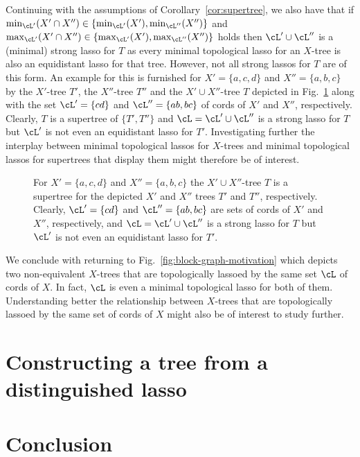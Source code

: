 Continuing with the assumptions of Corollary~\ref{cor:supertree}, we also have
that if $\min_{\cL'}(X'\cap X'')\in \{\min_{\cL'}(X'), \min_{\cL''}(X'')\}$
and $\max_{\cL'}(X'\cap X'')\in \{\max_{\cL'}(X'), \max_{\cL''}(X'')\}$ holds
then $\cL'\cup \cL''$ is a (minimal) strong lasso for $T$ as every minimal
topological lasso for an $X$-tree is also an equidistant lasso for that
tree. However, not all strong lassos for $T$ are of this form. An example for
this is furnished for $X'=\{a,c,d\}$ and $X''=\{a,b,c\}$ by the $X'$-tree
$T'$, the $X''$-tree $T''$ and the $X'\cup X''$-tree $T$ depicted in
Fig.~\ref{fig:supertree} along with the set $\cL'=\{cd\}$ and
$\cL''=\{ab,bc\}$ of cords of $X'$ and $X''$, respectively. Clearly, $T$ is a
supertree of $\{T',T''\}$ and $\cL=\cL'\cup\cL''$ is a strong lasso for $T$
but $\cL'$ is not even an equidistant lasso for $T'$. Investigating further
the interplay between minimal topological lassos for $X$-trees and minimal
topological lassos for supertrees that display them might therefore be of
interest.

\begin{figure}[h]
  \begin{center}
    
  \end{center}
  \caption{ For $X'=\{a,c,d\}$ and $X''=\{a,b,c\}$ the $X'\cup X''$-tree $T$
    is a supertree for the depicted $X'$ and $X''$ trees $T'$ and $T''$,
    respectively. Clearly, $\cL'=\{cd\}$ and $\cL''=\{ab,bc\}$ are sets of
    cords of $X'$ and $X''$, respectively, and $\cL=\cL'\cup\cL''$ is a strong
    lasso for $T$ but $\cL'$ is not even an equidistant lasso for $T'$.  }
  \label{fig:supertree}
\end{figure}

We conclude with returning to Fig.~\ref{fig:block-graph-motivation} which
depicts two non-equivalent $X$-trees that are topologically lassoed by the
same set $\cL$ of cords of $X$. In fact, $\cL$ is even a minimal topological
lasso for both of them.  Understanding better the relationship between
$X$-trees that are topologically lassoed by the same set of cords of $X$ might
also be of interest to study further.

\section{Constructing a tree from a distinguished lasso}
\label{sec:constr-tree-from}



\section{Conclusion}
\label{sec:conclusion-dist}



